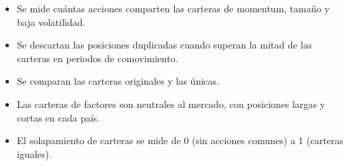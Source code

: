 \documentclass{article}
\newcommand{\cardtitlesize}{\fontsize{36.6}{43.9}\selectfont}
\newcommand{\cardtitle}[2][navy]{{\color{#1}\cardtitlesize\bfseries\textls[110]{\MakeUppercase{#2}}}\par\vspace{7mm}}
\begin{document}
\vfill
\hspace*{34mm}\begin{minipage}{773mm}
\begin{tcolorbox}[card]\cardtitle{Metodología}
\begin{minipage}[t]{0.48\linewidth}
\begin{itemize}
\item Se mide cuántas acciones comparten las carteras de momentum, tamaño y baja volatilidad.
\item Se descartan las posiciones duplicadas cuando superan la mitad de las carteras en periodos de comovimiento.
\item Se comparan las carteras originales y las únicas.
\end{itemize}
\end{minipage}\hfill
\begin{minipage}[t]{0.48\linewidth}
\begin{itemize}
\item Las carteras de factores son neutrales al mercado, con posiciones largas y cortas en cada país.
\item El solapamiento de carteras se mide de 0 (sin acciones comunes) a 1 (carteras iguales).
\end{itemize}
\end{minipage}
\end{tcolorbox}
\end{minipage}
\end{document}
